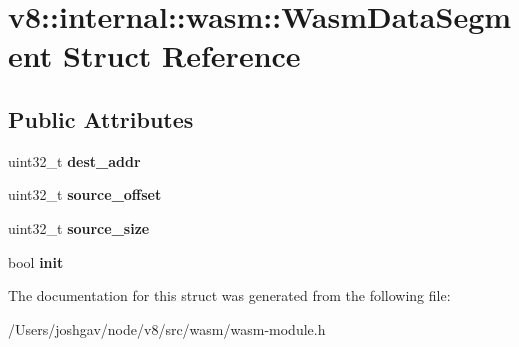\hypertarget{structv8_1_1internal_1_1wasm_1_1_wasm_data_segment}{}\section{v8\+:\+:internal\+:\+:wasm\+:\+:Wasm\+Data\+Segment Struct Reference}
\label{structv8_1_1internal_1_1wasm_1_1_wasm_data_segment}
\subsection*{Public Attributes}
\begin{DoxyCompactItemize}
\item 
uint32\+\_\+t {\bfseries dest\+\_\+addr}\hypertarget{structv8_1_1internal_1_1wasm_1_1_wasm_data_segment_afb0dd92f469dab3c3f5ae2a20e75f6c2}{}\label{structv8_1_1internal_1_1wasm_1_1_wasm_data_segment_afb0dd92f469dab3c3f5ae2a20e75f6c2}

\item 
uint32\+\_\+t {\bfseries source\+\_\+offset}\hypertarget{structv8_1_1internal_1_1wasm_1_1_wasm_data_segment_ac08799dc5a9ce43d943aa3ca1a5d9928}{}\label{structv8_1_1internal_1_1wasm_1_1_wasm_data_segment_ac08799dc5a9ce43d943aa3ca1a5d9928}

\item 
uint32\+\_\+t {\bfseries source\+\_\+size}\hypertarget{structv8_1_1internal_1_1wasm_1_1_wasm_data_segment_a36d23e56173a235dbc55712e4246ef29}{}\label{structv8_1_1internal_1_1wasm_1_1_wasm_data_segment_a36d23e56173a235dbc55712e4246ef29}

\item 
bool {\bfseries init}\hypertarget{structv8_1_1internal_1_1wasm_1_1_wasm_data_segment_a37b11a5338e5a8e90fe2c4db1c52a278}{}\label{structv8_1_1internal_1_1wasm_1_1_wasm_data_segment_a37b11a5338e5a8e90fe2c4db1c52a278}

\end{DoxyCompactItemize}


The documentation for this struct was generated from the following file\+:\begin{DoxyCompactItemize}
\item 
/\+Users/joshgav/node/v8/src/wasm/wasm-\/module.\+h\end{DoxyCompactItemize}
